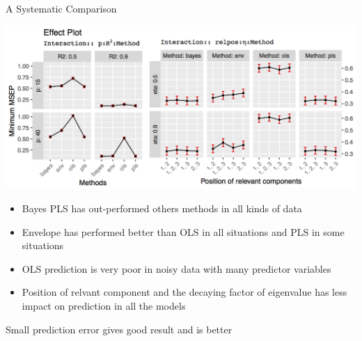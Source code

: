 \documentclass[ignorenonframetext,]{beamer}
\providecommand{\tightlist}{%
\setlength{\itemsep}{0pt}\setlength{\parskip}{0pt}}
\begin{document}
\begin{frame}{A Systematic Comparison}

\includegraphics[width=0.6\linewidth]{images/effect-plot}

\hypertarget{left}{}
\begin{itemize}
\tightlist
\item
  Bayes PLS has out-performed others methods in all kinds of data
\item
  Envelope has performed better than OLS in all situations and PLS in
  some situations
\end{itemize}

\hypertarget{right}{}
\begin{itemize}
\tightlist
\item
  OLS prediction is very poor in noisy data with many predictor
  variables
\item
  Position of relvant component and the decaying factor of eigenvalue
  has less impact on prediction in all the models
\end{itemize}

\begin{block}{Small prediction error gives good result and is better}

\end{block}

\end{frame}
\end{document}
